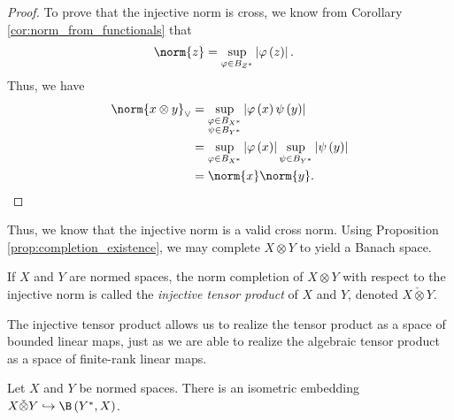 \begin{proof}
  To prove that the injective norm is cross, we know from Corollary \ref{cor:norm_from_functionals} that
  \begin{align*}
    \norm{z} &= \sup_{\varphi\in B_{Z^{\ast}}}\left\vert \varphi\left( z \right) \right\vert.
  \end{align*}
  Thus, we have
  \begin{align*}
    \norm{x\otimes y}_{\vee} &= \sup_{\substack{\varphi\in B_{X^{\ast}}\\\psi\in B_{Y^{\ast}}}}\left\vert \varphi\left( x \right) \psi\left( y \right)\right\vert\\
                             &= \sup_{\varphi\in B_{X^{\ast}}}\left\vert \varphi\left( x \right) \right\vert\sup_{\psi\in B_{Y^{\ast}}}\left\vert \psi\left( y \right) \right\vert\\
                             &= \norm{x}\norm{y}.
  \end{align*}
\end{proof}
Thus, we know that the injective norm is a valid cross norm. Using Proposition \ref{prop:completion_existence}, we may complete $X\otimes Y$ to yield a Banach space.
\begin{definition}
  If $X$ and $Y$ are normed spaces, the norm completion of $X\otimes Y$ with respect to the injective norm is called the \textit{injective tensor product} of $X$ and $Y$, denoted $X\check\otimes Y$.
\end{definition}
The injective tensor product allows us to realize the tensor product as a space of bounded linear maps, just as we are able to realize the algebraic tensor product as a space of finite-rank linear maps.
\begin{proposition}
  Let $X$ and $Y$ be normed spaces. There is an isometric embedding $X\check\otimes Y \hookrightarrow \B\left( Y^{\ast},X \right)$.
\end{proposition}
